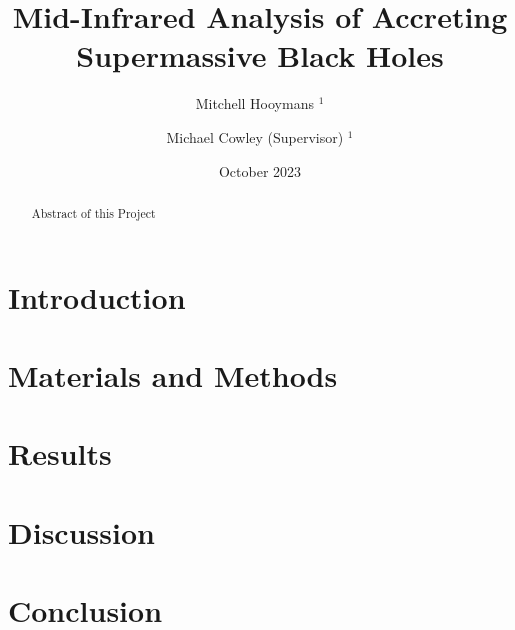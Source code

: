 \documentclass[11pt]{iopart}
\date{October 2023}
\begin{document}
\title{Mid-Infrared Analysis of Accreting Supermassive Black Holes}
\author{Mitchell Hooymans $^1$}

\author{Michael Cowley (Supervisor) $^1$}
\address{$^1$ Queensland University of Technology, Brisbane, Australia, 4000}

\begin{abstract}
    Abstract of this Project \cite{assef_mid-infrared_2013}
\end{abstract}
\ioptwocol
\section{Introduction}
\newpage
\section{Materials and Methods}
\newpage
\section{Results}
\section{Discussion}
\section{Conclusion}



\end{document}
